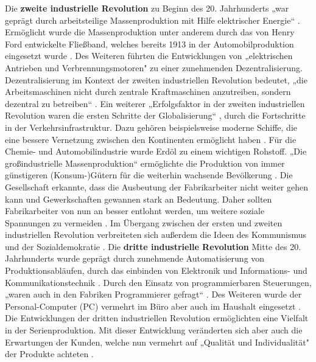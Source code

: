 \newline\newline
Die \textbf{zweite industrielle Revolution} zu Beginn des 20. Jahrhunderts „war geprägt durch arbeitsteilige Massenproduktion mit Hilfe elektrischer Energie“ \cite[S.5]{15}. Ermöglicht wurde die Massenproduktion unter anderem durch das von Henry Ford entwickelte Fließband, welches bereits 1913 in der Automobilproduktion eingesetzt wurde \cite{10}. Des Weiteren führten die Entwicklungen von „elektrischen Antrieben und Verbrennungsmotoren" \cite[S.6]{15} zu einer zunehmenden Dezentralisierung. Dezentralisierung im Kontext der zweiten industriellen Revolution bedeutet, „die Arbeitsmaschinen nicht durch zentrale Kraftmaschinen anzutreiben, sondern dezentral zu betreiben“ \cite[S.6]{15}. Ein weiterer „Erfolgsfaktor in der zweiten industriellen Revolution waren die ersten Schritte der Globalisierung“ \cite{9}, durch die Fortschritte in der Verkehrsinfrastruktur. Dazu gehören beispielsweise moderne Schiffe, die eine bessere Vernetzung zwischen den Kontinenten ermöglicht haben \cite{9}. Für die Chemie- und Automobilindustrie wurde Erdöl zu einem wichtigen Rohstoff. „Die großindustrielle Massenproduktion“ \cite[S.6]{15} ermöglichte die Produktion von immer günstigeren (Konsum-)Gütern für die weiterhin wachsende Bevölkerung \cite[S.6]{15}. Die Gesellschaft erkannte, dass die Ausbeutung der Fabrikarbeiter nicht weiter gehen kann und Gewerkschaften gewannen stark an Bedeutung. Daher sollten Fabrikarbeiter von nun an besser entlohnt werden, um weitere soziale Spannungen zu vermeiden \cite[S.6]{15}. Im Übergang zwischen der ersten und zweiten industriellen Revolution verbreiteten sich außerdem die Ideen des Kommunismus und der Sozialdemokratie \cite[S.6]{15}.
\newline\newline
Die \textbf{dritte industrielle Revolution} Mitte des 20. Jahrhunderts wurde geprägt durch zunehmende Automatisierung von Produktionsabläufen, durch das einbinden von Elektronik und Informations- und Kommunikationstechnik \cite[S.7]{15}. Durch den Einsatz von programmierbaren Steuerungen, „waren auch in den Fabriken Programmierer gefragt“ \cite{10}. Des Weiteren wurde der Personal-Computer (PC) vermehrt im Büro aber auch im Haushalt eingesetzt \cite{9}. Die Entwicklungen der dritten industriellen Revolution ermöglichten eine Vielfalt in der Serienproduktion. Mit dieser Entwicklung veränderten sich aber auch die Erwartungen der Kunden, welche nun vermehrt auf „Qualität und Individualität" \cite[S.7]{15} der Produkte achteten \cite[S.7]{15}.
